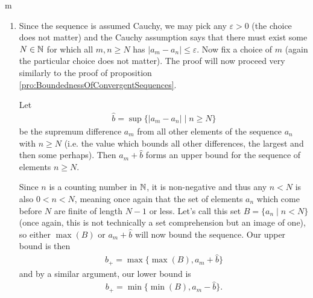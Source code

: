 \documentclass[11pt]{article}
\begin{document}
\begin{my proof}{m}

\begin{enumerate}
\item Since the sequence is assumed Cauchy, we may pick any $\varepsilon > 0$ (the choice does not matter) and the Cauchy assumption says that there must exist some $N \in \mathbb{N}$ for which all $m,n \ge N$ has $|a_m - a_n| \le \varepsilon$. Now fix a choice of $m$ (again the particular choice does not matter). The proof will now proceed very similarly to the proof of proposition \ref{pro:BoundednessOfConvergentSequences}.

Let \begin{gather*}
\hat{b} = \sup\{|a_m - a_n| \mid n \ge N\}
\end{gather*}
be the supremum difference $a_m$ from all other elements of the sequence $a_n$ with $n \ge N$ (i.e. the value which bounds all other differences, the largest and then some perhaps). Then $a_m + \hat{b}$ forms an upper bound for the sequence of elements $n \ge N$. 

Since $n$ is a counting number in $\mathbb{N}$, it is non-negative and thus any $n < N$ is also $0 < n < N$, meaning once again that the set of elements $a_n$ which come before $N$ are finite of length $N-1$ or less. Let's call this set $B = \{ a_n \mid n < N \}$ (once again, this is not technically a set comprehension but an image of one), so either $\max(B)$ or $a_m + \hat{b}$ will now bound the sequence. Our upper bound is then \begin{gather*}
b_+ = \max \big\{ \max(B), a_m + \hat{b} \big\}
\end{gather*}
and by a similar argument, our lower bound is \begin{gather*}
b_+ = \min \big\{ \min(B), a_m - \hat{b} \big\}.
\end{gather*}


\end{enumerate}
\end{my proof}
\end{document}
